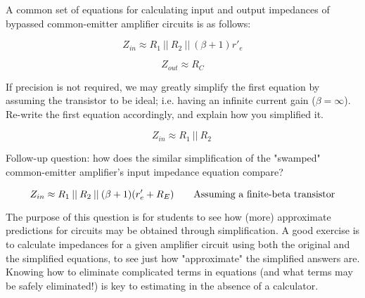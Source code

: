 

A common set of equations for calculating input and output impedances of bypassed common-emitter amplifier circuits is as follows:

$$Z_{in} \approx R_1 \> || \> R_2 \> || \> (\beta + 1)r'_e$$

$$Z_{out} \approx R_C$$

If precision is not required, we may greatly simplify the first equation by assuming the transistor to be ideal; i.e. having an infinite current gain ($\beta = \infty$).  Re-write the first equation accordingly, and explain how you simplified it.







$$Z_{in} \approx R_1 \> || \> R_2 \>$$

\vskip 10pt

Follow-up question: how does the similar simplification of the "swamped" common-emitter amplifier's input impedance equation compare?

$$Z_{in} \approx R_1 \> || \> R_2 \> || \> (\beta + 1)(r'_e + R_E) \hbox{\hskip 20pt Assuming a finite-beta transistor}$$







The purpose of this question is for students to see how (more) approximate predictions for circuits may be obtained through simplification.  A good exercise is to calculate impedances for a given amplifier circuit using both the original and the simplified equations, to see just how "approximate" the simplified answers are.  Knowing how to eliminate complicated terms in equations (and what terms may be safely eliminated!) is key to estimating in the absence of a calculator.







